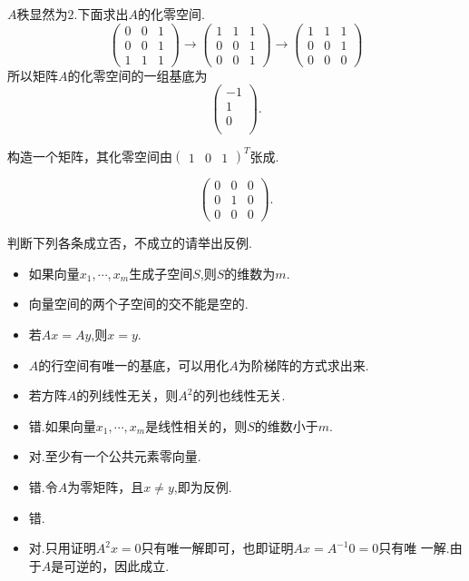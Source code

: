﻿\documentclass{book} \usepackage{exsheets} \usepackage{xeCJK}
\begin{document}
\begin{solution}
  $A$秩显然为$2$.下面求出$A$的化零空间.
$$
\begin{pmatrix}
  0&0&1\\
  0&0&1\\
  1&1&1
\end{pmatrix}\to
\begin{pmatrix}
  1&1&1\\
  0&0&1\\
  0&0&1
\end{pmatrix}\to
\begin{pmatrix}
  1&1&1\\
  0&0&1\\
  0&0&0
\end{pmatrix}
$$
所以矩阵$A$的化零空间的一组基底为
$$
\begin{pmatrix}
  -1\\
  1\\
  0\\
\end{pmatrix}.
$$
\end{solution}
\begin{question}
  构造一个矩阵，其化零空间由$
  \begin{pmatrix}
    1&0&1
  \end{pmatrix}^T $张成.
\end{question}
\begin{solution}
$$
  \begin{pmatrix}
    0&0&0\\
    0&1&0\\
    0&0&0
  \end{pmatrix}.
$$
\end{solution}
\begin{question}
  判断下列各条成立否，不成立的请举出反例.
  \begin{itemize}
  \item 如果向量$x_1,\cdots,x_m$生成子空间$S$,则$S$的维数为$m$.
  \item 向量空间的两个子空间的交不能是空的.
  \item 若$Ax=Ay$,则$x=y$.
  \item $A$的行空间有唯一的基底，可以用化$A$为阶梯阵的方式求出来.
  \item 若方阵$A$的列线性无关，则$A^2$的列也线性无关.
  \end{itemize}
\end{question}
\begin{solution}
  \begin{itemize}
  \item 错.如果向量$x_1,\cdots,x_m$是线性相关的，则$S$的维数小于$m$.
  \item 对.至少有一个公共元素零向量.
  \item 错.令$A$为零矩阵，且$x\neq y$,即为反例.
  \item 错.
  \item 对.只用证明$A^2x=0$只有唯一解即可，也即证明$Ax=A^{-1}0=0$只有唯
    一解.由于$A$是可逆的，因此成立.
  \end{itemize}
\end{solution}
\end{document}

